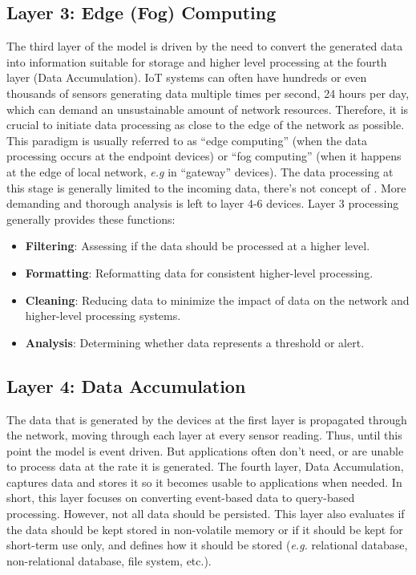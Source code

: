 \subsection{Layer 3: Edge (Fog) Computing}
\label{sec:iot-model-layer3}

The third layer of the model is driven by the need to convert the generated data into information suitable for storage and higher level processing at the fourth layer (Data Accumulation). \acs{IoT} systems can often have hundreds or even thousands of sensors generating data multiple times per second, 24 hours per day, which can demand an unsustainable amount of network resources. Therefore, it is crucial to initiate data processing as close to the edge of the network as possible. This paradigm is usually referred to as ``edge computing'' (when the data processing occurs at the endpoint devices) or ``fog computing'' (when it happens at the edge of local network, \textit{e.g} in ``gateway'' devices). The data processing at this stage is generally limited to the incoming data, there's not concept of . More demanding and thorough analysis is left to layer 4-6 devices. Layer 3 processing generally provides these functions:

\begin{itemize}
    \item \textbf{Filtering}: Assessing if the data should be processed at a higher level. 
    \item \textbf{Formatting}: Reformatting data for consistent higher-level processing.
    \item \textbf{Cleaning}: Reducing data to minimize the impact of data on the network and higher-level processing systems.
    \item \textbf{Analysis}: Determining whether data represents a threshold or alert.
\end{itemize}

\subsection{Layer 4: Data Accumulation}
\label{sec:iot-model-layer4}

The data that is generated by the devices at the first layer is propagated through the network, moving through each layer at every sensor reading. Thus, until this point the model is event driven. 
But applications often don't need, or are unable to process data at the rate it is generated. The fourth layer, Data Accumulation, captures data and stores it so it becomes usable to applications when needed. In short, this layer focuses on converting event-based data to query-based processing. However, not all data should be persisted. This layer also evaluates if the data should be kept stored in non-volatile memory or if it should be kept for short-term use only, and defines how it should be stored (\textit{e.g.} relational database, non-relational database, file system, etc.).

